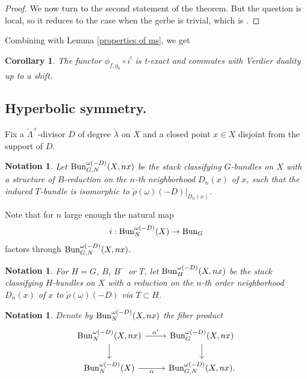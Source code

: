 \documentclass[9pt]{amsart}
\newtheorem{cor}[subsubsection]{Corollary}
\newtheorem{ntn}[subsubsection]{Notation}
\numberwithin{equation}{section}
\begin{document}
\begin{proof}
	We now turn to the second statement of the theorem. But the question is local, so it reduces to the case when the gerbe is trivial, which is \cite[Proposition 2.3.1]{NT}.
 \end{proof}

Combining with Lemma \ref{properties of ms}, we get
\begin{cor}
	The functor $\phi_{f, y_0} \circ i^! $ is t-exact and commutes with Verdier duality up to a shift.
\end{cor}


\subsection{Hyperbolic symmetry.} Fix a $\check{\Lambda}^+$-divisor $D$ of degree $\check{\lambda}$ on $X$ and a closed point $x \in X$ disjoint from the support of $D$. 

\begin{ntn}
	Let $\operatorname{{Bun}}_{G, N}^{\omega(-D)}(X, nx)$ be the stack classifying $G$-bundles on $X$ with a structure of $B$-reduction on the $n$-th neighborhood $D_{n}(x)$ of $x$, such that the induced $T$-bundle is isomorphic to $\check{\rho}(\omega)(-D)|_{D_{n}(x)}$. 
\end{ntn}

Note that for $n$ large enough the natural map 
$$i: \operatorname{{Bun}}_{N}^{\omega(-D)}(X) \rightarrow \operatorname{{Bun}}_G$$
factors through $\operatorname{{Bun}}_{G, N}^{\omega(-D)}(X, nx).$
\begin{ntn}
For $H = G$, $B$, $B^-$ or $T$, let $\operatorname{{Bun}}_{H}^{\omega(-D)}(X, nx)$ be the stack classifying $H$-bundles on $X$ with a reduction on the $n$-th order neighborhood $D_{n}(x)$ of $x$ to $\check{\rho}(\omega)(-D)$ via $T \subset H$. 
\end{ntn}

\begin{ntn}
Denote by $\operatorname{{Bun}}_{N}^{\omega(-D)}(X, nx)$ the fiber product 
\begin{equation}\label{players}
\begin{tikzcd}
\Bun_{N}^{\omega(-D)}(X, nx)\ar[r, rightarrow, "\alpha^{\prime}"]\ar[d, rightarrow, ""']&   	\Bun_{G}^{\omega(-D)}(X, nx)\ar[d, rightarrow, ""']  \\
\Bun_{N}^{\omega(-D)}(X)\ar[r, rightarrow, "\alpha"']&   \Bun_{G, N}^{\omega(-D)}(X, nx).
\end{tikzcd}
\end{equation}
\end{ntn}
\end{document}

